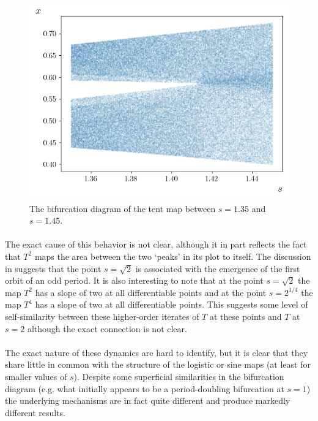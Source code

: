 \documentclass{article}
\begin{document}
\begin{figure}[H]
    \centering
    \hspace{-0.5in}
    \includegraphics[scale = 0.6]{Figure_Blow_Up_3.png}
	\caption{The bifurcation diagram of the tent map between $s = 1.35$ and $s = 1.45$.}
    \label{fig:tent_blow_up_3}
\end{figure}

\paragraph{}
The exact cause of this behavior is not clear, although it in part reflects the fact that $T^2$ 
maps the area between the two `peaks' in its plot to itself. The discussion in \cite{may_bifn} suggests that 
the point $ s= \sqrt{2}$ is associated with the emergence of the first orbit of an odd period. It is 
also interesting to note that at the point $s = \sqrt{2}$ the map $T^2$ has a slope of two at all differentiable 
points and at the point $s = 2^{1/4}$ the map $T^4$ has a slope of two at all differentiable points. 
This suggests some level of self-similarity between these higher-order iterates of $T$ at these 
points and $T$ at 
$s=2$ although the exact connection is not clear.

\paragraph{}
The exact nature of these dynamics are hard to identify, but it is clear that they share little in 
common with the structure of the logistic or sine maps (at least for smaller values of $s$). Despite 
some superficial similarities in the bifurcation diagram (e.g. what initially appears to be a period-doubling 
bifurcation at $s = 1$) the underlying mechanisms are in fact quite different and produce markedly different results.
\end{document}
